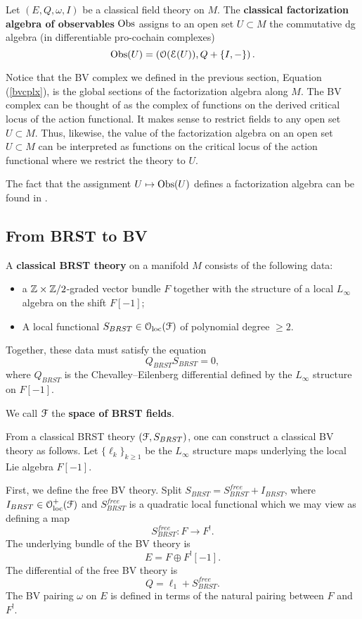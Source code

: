 \documentclass[10pt, oneside]{article}
\begin{document}
\begin{definition}
Let $(E, Q, \omega, I)$ be a classical field theory on $M$. The {\bf classical factorization algebra of observables} $\mathrm{Obs}$ assigns to an open set $U \subset M$ the commutative dg algebra (in differentiable pro-cochain complexes)
\[
\mathrm{Obs}(U) = \left(\mathcal O(\mathcal E(U)) , Q + \{I,-\}\right) .
\]
\end{definition}

Notice that the BV complex we defined in the previous section, Equation (\ref{bvcplx}), is the global sections of the factorization algebra along $M$.
The BV complex can be thought of as the complex of functions on the derived critical locus of the action functional.
It makes sense to restrict fields to any open set $U \subset M$. 
Thus, likewise, the value of the factorization algebra on an open set $U \subset M$ can be interpreted as functions on the critical locus of the action functional where we restrict the theory to $U$. 

The fact that the assignment $U \mapsto \mathrm{Obs}(U)$ defines a factorization algebra can be found in \cite[Section 3]{Book2}. 

\subsection{From BRST to BV}

\begin{definition}
A {\bf classical BRST theory} on a manifold $M$ consists of the following data:
\begin{itemize}
\item a $\mathbb Z\times\mathbb Z/2$-graded vector bundle $F$ together with the structure of a local $L_\infty$ algebra on the shift $F[-1]$;
\item A local functional $S_{BRST} \in \mathcal{O}_{\rm loc}(\mathcal F)$ of polynomial degree $\geq 2$.
\end{itemize}
Together, these data must satisfy the equation
\[Q_{BRST} S_{BRST} = 0,\]
where $Q_{BRST}$ is the Chevalley--Eilenberg differential defined by the $L_\infty$ structure on $F[-1]$. 
\end{definition}

We call $\mathcal F$ the {\bf space of BRST fields}.

From a classical BRST theory $(\mathcal F, S_{BRST})$, one can construct a classical BV theory as follows. Let $\{\ell_k\}_{k\geq 1}$ be the $L_\infty$ structure maps underlying the local Lie algebra $F[-1]$.

First, we define the free BV theory. Split $S_{BRST} = S^{free}_{BRST} + I_{BRST}$, where $I_{BRST}\in\mathcal{O}_{\rm loc}^+(\mathcal F)$ and $S^{free}_{BRST}$ is a quadratic local functional which we may view as defining a map
\[S^{free}_{BRST}\colon F\rightarrow F^!.\]
The underlying bundle of the BV theory is
\[
E = F \oplus F^! [-1].
\]
The differential of the free BV theory is
\[
Q = \ell_1 + S^{free}_{BRST}.
\]
The BV pairing $\omega$ on $E$ is defined in terms of the natural pairing between $F$ and $F^!$.
\end{document}

